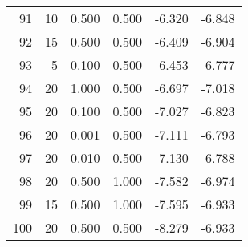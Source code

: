 \begin{tabular}{rrrrrr}
    91 &        10 &  0.500 & 0.500 &                 -6.320 &      -6.848 \\
    92 &        15 &  0.500 & 0.500 &                 -6.409 &      -6.904 \\
    93 &         5 &  0.100 & 0.500 &                 -6.453 &      -6.777 \\
    94 &        20 &  1.000 & 0.500 &                 -6.697 &      -7.018 \\
    95 &        20 &  0.100 & 0.500 &                 -7.027 &      -6.823 \\
    96 &        20 &  0.001 & 0.500 &                 -7.111 &      -6.793 \\
    97 &        20 &  0.010 & 0.500 &                 -7.130 &      -6.788 \\
    98 &        20 &  0.500 & 1.000 &                 -7.582 &      -6.974 \\
    99 &        15 &  0.500 & 1.000 &                 -7.595 &      -6.933 \\
   100 &        20 &  0.500 & 0.500 &                 -8.279 &      -6.933 \\
\bottomrule
\end{tabular}
